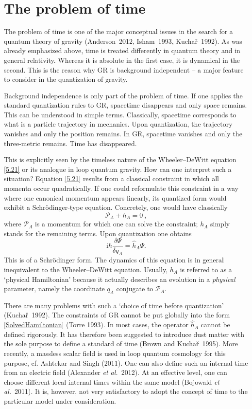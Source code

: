 \documentclass[12pt]{article}
\newcommand{\be}{\begin{equation}}
\newcommand{\ee}{\end{equation}}
\newcommand{\lb}{\label}
\begin{document}
\section{The problem of time}  


The problem of time is one of the major conceptual issues in the
search for a quantum theory of gravity (Anderson~2012, Isham~1993,
Kucha\v{r}~1992). 
As was already emphasized above, time is treated
differently in quantum theory and in general relativity. Whereas it is
absolute in the first case, it is dynamical in the second. This is
the reason why GR is background independent -- a major feature to
consider in the quantization of gravity.

Background independence is only part of the problem of time. If one  
applies the standard quantization rules to GR, spacetime disappears
and only space remains. This can be understood in simple
terms. Classically, spacetime corresponds to what is a particle
trajectory in mechanics. Upon quantization, the trajectory vanishes and only the
position remains. In GR, spacetime vanishes and only the three-metric
remains. Time has disappeared. 

This is explicitly seen by the timeless nature of the Wheeler--DeWitt
equation \eqref{5.21} or its analogue in loop quantum gravity. How can
one interpret such a situation? Equation \eqref{5.21} results from a
classical constraint in which all momenta occur quadratically. If one
could reformulate this constraint in a way where one canonical momentum
appears linearly, its quantized form would exhibit a
Schr\"odinger-type equation. Concretely, one would have classically
\be
\lb{SolvedHamiltonian}
\mathcal{P}_A+h_A=0\ ,
\ee
where $\mathcal{P}_A$ is a momentum for which
one can solve the constraint; $h_A$ simply stands for the remaining terms.
Upon quantization one obtains
\be
\lb{effectiveS}
\mathrm{i}\hbar\frac{\delta\Psi}{\delta q_A}=\widehat{h}_A\Psi.
\ee
This is of a Schr\"odinger form. 
The dynamics of this equation is
  in general inequivalent to the Wheeler--DeWitt equation.
Usually, $h_A$ is referred to as a `physical Hamiltonian' because it
actually describes an evolution in a {\it physical} parameter, namely the
coordinate $q_A$ conjugate to $\mathcal{P}_A$. 

There are many problems with such a `choice of time before
quantization' (Kucha\v{r}~1992). The constraints of GR cannot be put
globally into the form \eqref{SolvedHamiltonian} (Torre 1993). In most
cases, the operator $\widehat{h}_A$ cannot be defined rigorously. 
It has therefore been suggested to introduce dust matter with the sole
purpose to define a standard of time (Brown and Kucha\v{r}~1995). More
recently, a massless scalar field is used in loop quantum cosmology 
for this purpose, cf. Ashtekar and Singh (2011). One can also define
such an internal time from an electric field (Alexander {\em et
  al.}~2012). At an effective level, one can choose different local internal
times within the same model (Bojowald {\em et al.}~2011). It is,
however, not very satisfactory to adopt the concept of time to the
particular model under consideration.
\end{document}
